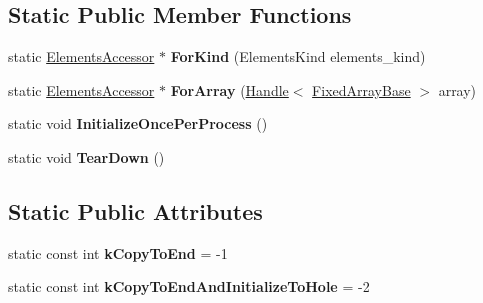 \subsection*{Static Public Member Functions}
\begin{DoxyCompactItemize}
\item 
\hypertarget{classv8_1_1internal_1_1_elements_accessor_af880d16ed39d123746b68f9510956872}{}static \hyperlink{classv8_1_1internal_1_1_elements_accessor}{Elements\+Accessor} $\ast$ {\bfseries For\+Kind} (Elements\+Kind elements\+\_\+kind)\label{classv8_1_1internal_1_1_elements_accessor_af880d16ed39d123746b68f9510956872}

\item 
\hypertarget{classv8_1_1internal_1_1_elements_accessor_adbe296c49b265f7f2b08d5afe67398f0}{}static \hyperlink{classv8_1_1internal_1_1_elements_accessor}{Elements\+Accessor} $\ast$ {\bfseries For\+Array} (\hyperlink{classv8_1_1internal_1_1_handle}{Handle}$<$ \hyperlink{classv8_1_1internal_1_1_fixed_array_base}{Fixed\+Array\+Base} $>$ array)\label{classv8_1_1internal_1_1_elements_accessor_adbe296c49b265f7f2b08d5afe67398f0}

\item 
\hypertarget{classv8_1_1internal_1_1_elements_accessor_a7d9e3760dd5aad13d53c3ad1e15a8cad}{}static void {\bfseries Initialize\+Once\+Per\+Process} ()\label{classv8_1_1internal_1_1_elements_accessor_a7d9e3760dd5aad13d53c3ad1e15a8cad}

\item 
\hypertarget{classv8_1_1internal_1_1_elements_accessor_acf8472f5ad7353960fa3564b575231c2}{}static void {\bfseries Tear\+Down} ()\label{classv8_1_1internal_1_1_elements_accessor_acf8472f5ad7353960fa3564b575231c2}

\end{DoxyCompactItemize}
\subsection*{Static Public Attributes}
\begin{DoxyCompactItemize}
\item 
\hypertarget{classv8_1_1internal_1_1_elements_accessor_a8f8b80e6b69040c509a1ce7774ee48b1}{}static const int {\bfseries k\+Copy\+To\+End} = -\/1\label{classv8_1_1internal_1_1_elements_accessor_a8f8b80e6b69040c509a1ce7774ee48b1}

\item 
\hypertarget{classv8_1_1internal_1_1_elements_accessor_a323719573cd6be900ebf66af3244cc97}{}static const int {\bfseries k\+Copy\+To\+End\+And\+Initialize\+To\+Hole} = -\/2\label{classv8_1_1internal_1_1_elements_accessor_a323719573cd6be900ebf66af3244cc97}

\end{DoxyCompactItemize}
